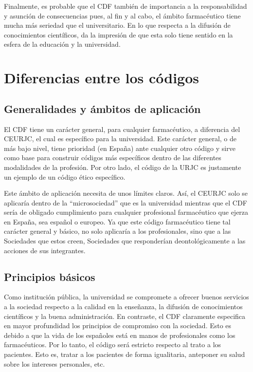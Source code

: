 \documentclass[11pt,a4paper]{article}
\begin{document}
Finalmente, es probable que el CDF también de importancia a la responsabilidad y asunción de consecuencias pues, al fin y al cabo, el ámbito farmacéutico tiene mucha más seriedad que el universitario. En lo que respecta a la difusión de conocimientos científicos, da la impresión de que esta solo tiene sentido en la esfera de la educación y la universidad.

\section{Diferencias entre los códigos}
\subsection{Generalidades y ámbitos de aplicación}
El CDF tiene un carácter general, para cualquier farmacéutico, a diferencia del CEURJC, el cual es específico para la universidad. Este carácter general, o de más bajo nivel, tiene prioridad (en España) ante cualquier otro código y sirve como base para construir códigos más específicos dentro de las diferentes modalidades de la profesión. Por otro lado, el código de la URJC es justamente un ejemplo de un código ético específico. 

Este ámbito de aplicación necesita de unos límites claros. Así, el CEURJC solo se aplicaría dentro de la ``microsociedad'' que es la universidad mientras que el CDF sería de obligado cumplimiento para cualquier profesional farmacéutico que ejerza en España, sea español o europeo. Ya que este código farmacéutico tiene tal carácter general y básico, no solo aplicaría a los profesionales, sino que a las Sociedades que estos creen, Sociedades que responderían deontológicamente a las acciones de sus integrantes. 

\subsection{Principios básicos}
 	Como institución pública, la universidad se compromete a ofrecer buenos servicios a la sociedad respecto a la calidad en la enseñanza, la difusión de conocimientos científicos y la buena administración. En contraste, el CDF claramente especifica en mayor profundidad los principios de compromiso con la sociedad. Esto es debido a que la vida de los españoles está en manos de profesionales como los farmacéuticos. Por lo tanto, el código será estricto respecto al trato a los pacientes. Esto es, tratar a los pacientes de forma igualitaria, anteponer su salud sobre los intereses personales, etc. 
\end{document}
